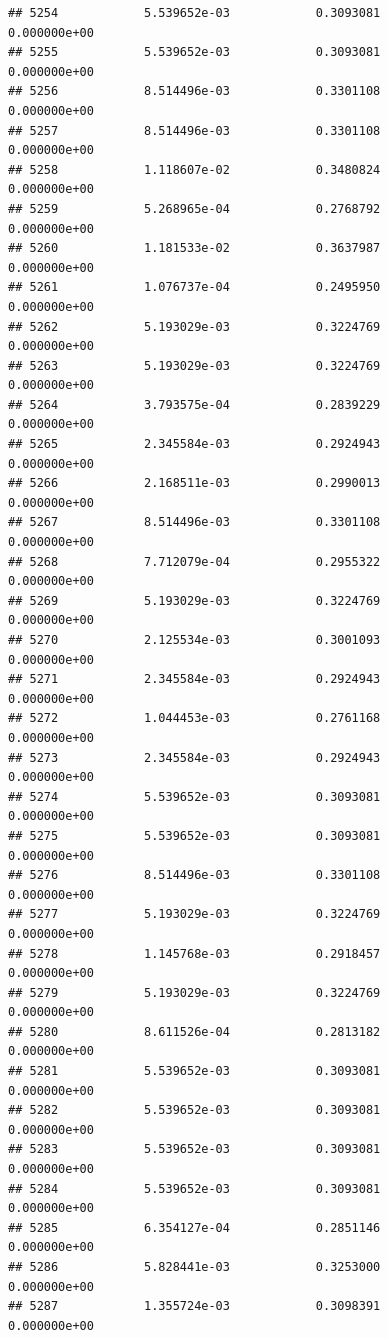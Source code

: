 \documentclass[
]{article}
\begin{document}
\begin{verbatim}
## 5254            5.539652e-03            0.3093081            0.000000e+00
## 5255            5.539652e-03            0.3093081            0.000000e+00
## 5256            8.514496e-03            0.3301108            0.000000e+00
## 5257            8.514496e-03            0.3301108            0.000000e+00
## 5258            1.118607e-02            0.3480824            0.000000e+00
## 5259            5.268965e-04            0.2768792            0.000000e+00
## 5260            1.181533e-02            0.3637987            0.000000e+00
## 5261            1.076737e-04            0.2495950            0.000000e+00
## 5262            5.193029e-03            0.3224769            0.000000e+00
## 5263            5.193029e-03            0.3224769            0.000000e+00
## 5264            3.793575e-04            0.2839229            0.000000e+00
## 5265            2.345584e-03            0.2924943            0.000000e+00
## 5266            2.168511e-03            0.2990013            0.000000e+00
## 5267            8.514496e-03            0.3301108            0.000000e+00
## 5268            7.712079e-04            0.2955322            0.000000e+00
## 5269            5.193029e-03            0.3224769            0.000000e+00
## 5270            2.125534e-03            0.3001093            0.000000e+00
## 5271            2.345584e-03            0.2924943            0.000000e+00
## 5272            1.044453e-03            0.2761168            0.000000e+00
## 5273            2.345584e-03            0.2924943            0.000000e+00
## 5274            5.539652e-03            0.3093081            0.000000e+00
## 5275            5.539652e-03            0.3093081            0.000000e+00
## 5276            8.514496e-03            0.3301108            0.000000e+00
## 5277            5.193029e-03            0.3224769            0.000000e+00
## 5278            1.145768e-03            0.2918457            0.000000e+00
## 5279            5.193029e-03            0.3224769            0.000000e+00
## 5280            8.611526e-04            0.2813182            0.000000e+00
## 5281            5.539652e-03            0.3093081            0.000000e+00
## 5282            5.539652e-03            0.3093081            0.000000e+00
## 5283            5.539652e-03            0.3093081            0.000000e+00
## 5284            5.539652e-03            0.3093081            0.000000e+00
## 5285            6.354127e-04            0.2851146            0.000000e+00
## 5286            5.828441e-03            0.3253000            0.000000e+00
## 5287            1.355724e-03            0.3098391            0.000000e+00

\end{verbatim}
\end{document}
